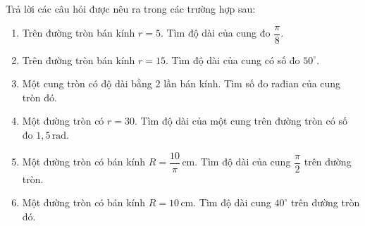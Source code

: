 \begin{ex}%
	Trả lời các câu hỏi được nêu ra trong các trường  hợp sau:
	\begin{enumerate}
		\item Trên đường tròn bán kính  $r=5$. Tìm độ dài của cung đo $\dfrac{\pi}{8}$.
		\item Trên đường tròn bán kính $r=15$.  Tìm độ dài của cung có số đo $50^{\circ}$.
		\item Một cung tròn có độ dài bằng $2$ lần bán kính. Tìm số đo  rađian của cung tròn đó.
		 \item Một đường tròn có $r=30$. Tìm độ dài của một cung trên đường tròn có số đo $1{,}5\,\mathrm{rad}$.
		\item Một đường  tròn có bán kính $R=\dfrac{10}{\pi}\, \mathrm{cm}$. Tìm độ dài của cung $\dfrac{\pi}{2}$ trên đường tròn.
		\item Một đường tròn có bán kính $R=10\,\mathrm{cm}$. Tìm độ dài cung $40^{\circ}$ trên đường tròn  đó.
	\end{enumerate}
\end{ex}

